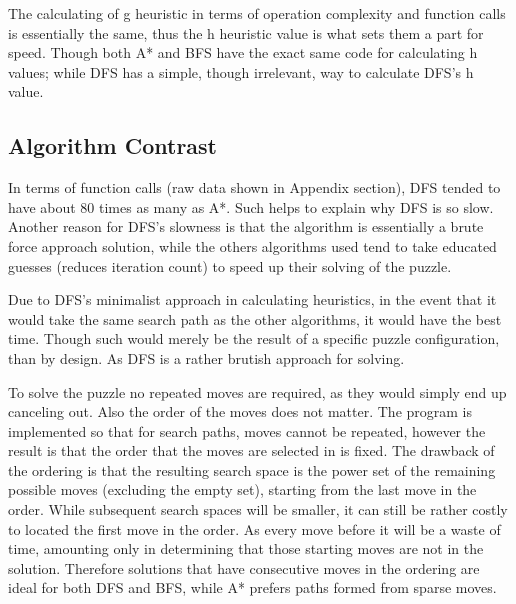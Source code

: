 The calculating of g heuristic in terms of operation complexity and function calls is essentially the same, thus the h heuristic value is what sets them a part for speed. Though both A* and BFS have the exact same code for calculating h values; while DFS has a simple, though irrelevant, way to calculate DFS's h value.
\newpage
\subsection{Algorithm Contrast}

In terms of function calls (raw data shown in Appendix section), DFS tended to have about 80 times as many as A*. Such helps to explain why DFS is so slow. Another reason for DFS's slowness is that the algorithm is essentially a brute force approach solution, while the others algorithms used tend to take educated guesses (reduces iteration count) to speed up their solving of the puzzle.
\newline
\newline

Due to DFS's minimalist approach in calculating heuristics, in the event that it would take the same search path as the other algorithms, it would have the best time. Though such would merely be the result of a specific puzzle configuration, than by design. As DFS is a rather brutish approach for solving.
\newline
\newline

To solve the puzzle no repeated moves are required, as they would simply end up canceling out. Also the order of the moves does not matter. The program is implemented so that for search paths, moves cannot be repeated, however the result is that the order that the moves are selected in is fixed. The drawback of the ordering is that the resulting search space is the power set of the remaining possible moves (excluding the empty set), starting from the last move in the order. While subsequent search spaces will be smaller, it can still be rather costly to located the first move in the order. As every move before it will be a waste of time, amounting only in determining that those starting moves are not in the solution. Therefore solutions that have consecutive moves in the ordering are ideal for both DFS and BFS, while A* prefers paths formed from sparse moves.